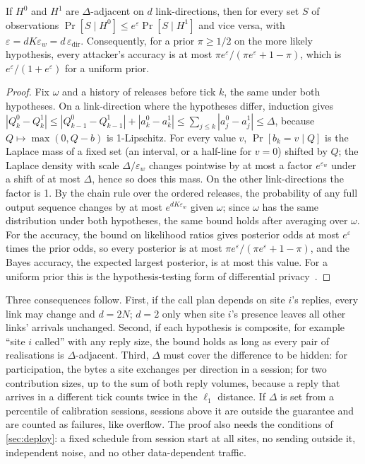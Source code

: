 \begin{proposition}\label{prop:dp}
If $H^0$ and $H^1$ are $\Delta$-adjacent on $d$ link-directions, then for every set $S$ of observations $\Pr[S\mid H^0]\le e^{\varepsilon}\Pr[S\mid H^1]$ and vice versa, with $\varepsilon=dK\varepsilon_w=d\,\varepsilon_{\mathrm{dir}}$. Consequently, for a prior $\pi\ge1/2$ on the more likely hypothesis, every attacker's accuracy is at most $\pi e^{\varepsilon}/(\pi e^{\varepsilon}+1-\pi)$, which is $e^{\varepsilon}/(1+e^{\varepsilon})$ for a uniform prior.
\end{proposition}
\begin{proof}
Fix $\omega$ and a history of releases before tick $k$, the same under both hypotheses. On a link-direction where the hypotheses differ, induction gives $|Q^0_{k}-Q^1_{k}|\le|Q^0_{k-1}-Q^1_{k-1}|+|a^0_{k}-a^1_{k}|\le\sum_{j\le k}|a^0_j-a^1_j|\le\Delta$, because $Q\mapsto\max(0,Q-b)$ is 1-Lipschitz. For every value $v$, $\Pr[b_k=v\mid Q]$ is the Laplace mass of a fixed set (an interval, or a half-line for $v=0$) shifted by $Q$; the Laplace density with scale $\Delta/\varepsilon_w$ changes pointwise by at most a factor $e^{\varepsilon_w}$ under a shift of at most $\Delta$, hence so does this mass. On the other link-directions the factor is 1. By the chain rule over the ordered releases, the probability of any full output sequence changes by at most $e^{dK\varepsilon_w}$ given $\omega$; since $\omega$ has the same distribution under both hypotheses, the same bound holds after averaging over $\omega$. For the accuracy, the bound on likelihood ratios gives posterior odds at most $e^{\varepsilon}$ times the prior odds, so every posterior is at most $\pi e^{\varepsilon}/(\pi e^{\varepsilon}+1-\pi)$, and the Bayes accuracy, the expected largest posterior, is at most this value. For a uniform prior this is the hypothesis-testing form of differential privacy~\cite{kairouz2015composition}.
\end{proof}
Three consequences follow. First, if the call plan depends on site $i$'s replies, every link may change and $d=2N$; $d=2$ only when site $i$'s presence leaves all other links' arrivals unchanged. Second, if each hypothesis is composite, for example ``site $i$ called'' with any reply size, the bound holds as long as every pair of realisations is $\Delta$-adjacent. Third, $\Delta$ must cover the difference to be hidden: for participation, the bytes a site exchanges per direction in a session; for two contribution sizes, up to the sum of both reply volumes, because a reply that arrives in a different tick counts twice in the $\ell_1$ distance. If $\Delta$ is set from a percentile of calibration sessions, sessions above it are outside the guarantee and are counted as failures, like overflow. The proof also needs the conditions of \cref{sec:deploy}: a fixed schedule from session start at all sites, no sending outside it, independent noise, and no other data-dependent traffic.

